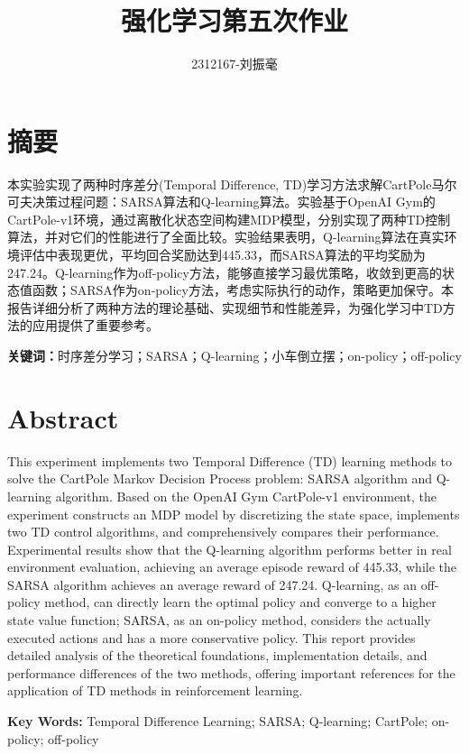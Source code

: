 \documentclass[12pt,a4paper]{article}
\title{\textbf{强化学习第五次作业}}
\author{2312167-刘振毫}
\date{}
\begin{document}
\maketitle

\section*{摘要}

本实验实现了两种时序差分(Temporal Difference, TD)学习方法求解CartPole马尔可夫决策过程问题：SARSA算法和Q-learning算法。实验基于OpenAI Gym的CartPole-v1环境，通过离散化状态空间构建MDP模型，分别实现了两种TD控制算法，并对它们的性能进行了全面比较。实验结果表明，Q-learning算法在真实环境评估中表现更优，平均回合奖励达到445.33，而SARSA算法的平均奖励为247.24。Q-learning作为off-policy方法，能够直接学习最优策略，收敛到更高的状态值函数；SARSA作为on-policy方法，考虑实际执行的动作，策略更加保守。本报告详细分析了两种方法的理论基础、实现细节和性能差异，为强化学习中TD方法的应用提供了重要参考。

\textbf{关键词：}时序差分学习；SARSA；Q-learning；小车倒立摆；on-policy；off-policy

\section*{Abstract}

This experiment implements two Temporal Difference (TD) learning methods to solve the CartPole Markov Decision Process problem: SARSA algorithm and Q-learning algorithm. Based on the OpenAI Gym CartPole-v1 environment, the experiment constructs an MDP model by discretizing the state space, implements two TD control algorithms, and comprehensively compares their performance. Experimental results show that the Q-learning algorithm performs better in real environment evaluation, achieving an average episode reward of 445.33, while the SARSA algorithm achieves an average reward of 247.24. Q-learning, as an off-policy method, can directly learn the optimal policy and converge to a higher state value function; SARSA, as an on-policy method, considers the actually executed actions and has a more conservative policy. This report provides detailed analysis of the theoretical foundations, implementation details, and performance differences of the two methods, offering important references for the application of TD methods in reinforcement learning.

\textbf{Key Words:} Temporal Difference Learning; SARSA; Q-learning; CartPole; on-policy; off-policy
\end{document}
